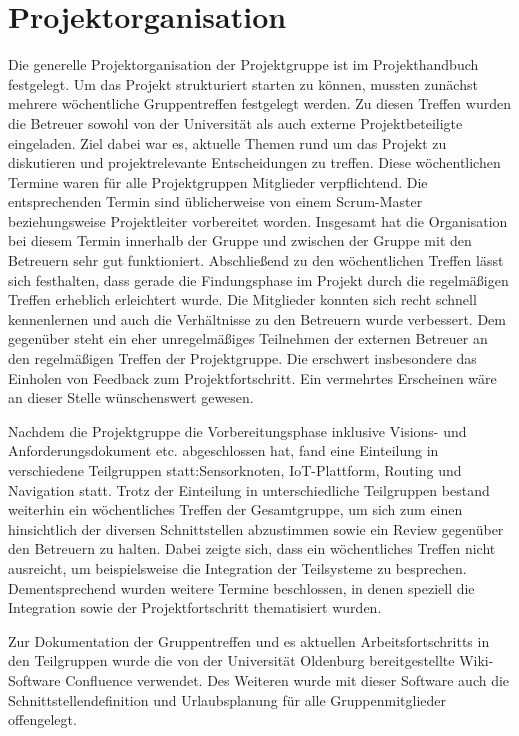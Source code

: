 \section{Projektorganisation}
Die generelle Projektorganisation der Projektgruppe ist im Projekthandbuch festgelegt. 
Um das Projekt strukturiert starten zu können, mussten zunächst mehrere wöchentliche Gruppentreffen festgelegt werden.
Zu diesen Treffen wurden die Betreuer sowohl von der Universität als auch externe Projektbeteiligte eingeladen.
Ziel dabei war es, aktuelle Themen rund um das Projekt zu diskutieren und projektrelevante Entscheidungen zu treffen.
Diese wöchentlichen Termine waren für alle Projektgruppen Mitglieder verpflichtend.
Die entsprechenden Termin sind üblicherweise von einem Scrum-Master beziehungsweise Projektleiter vorbereitet worden.
Insgesamt hat die Organisation bei diesem Termin innerhalb der Gruppe und zwischen der Gruppe mit den Betreuern sehr gut funktioniert.
Abschließend zu den wöchentlichen Treffen lässt sich festhalten, dass gerade die Findungsphase im Projekt durch die regelmäßigen Treffen erheblich erleichtert wurde.
Die Mitglieder konnten sich recht schnell kennenlernen und auch die Verhältnisse zu den Betreuern wurde verbessert.
Dem gegenüber steht ein eher unregelmäßiges Teilnehmen der externen Betreuer an den regelmäßigen Treffen der Projektgruppe.
Die erschwert insbesondere das Einholen von Feedback zum Projektfortschritt.
Ein vermehrtes Erscheinen wäre an dieser Stelle wünschenswert gewesen. \par\medskip
Nachdem die Projektgruppe die Vorbereitungsphase inklusive Visions- und Anforderungsdokument etc. abgeschlossen hat, fand eine Einteilung in verschiedene Teilgruppen statt:Sensorknoten, IoT-Plattform, Routing und Navigation statt. 
Trotz der Einteilung in unterschiedliche Teilgruppen bestand weiterhin ein wöchentliches Treffen der Gesamtgruppe, um sich zum einen hinsichtlich der diversen Schnittstellen abzustimmen sowie ein Review gegenüber den Betreuern zu halten. 
Dabei zeigte sich, dass ein wöchentliches Treffen nicht ausreicht, um beispielsweise die Integration der Teilsysteme zu besprechen. 
Dementsprechend wurden weitere Termine beschlossen, in denen speziell die Integration sowie der Projektfortschritt thematisiert wurden. \par\medskip
Zur Dokumentation der Gruppentreffen und es aktuellen Arbeitsfortschritts in den Teilgruppen wurde die von der Universität Oldenburg bereitgestellte Wiki-Software Confluence verwendet. 
Des Weiteren wurde mit dieser Software auch die Schnittstellendefinition und Urlaubsplanung für alle Gruppenmitglieder offengelegt. 
